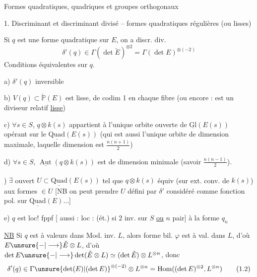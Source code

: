 Formes quadratiques, quadriques et groupes orthogonaux

1. Discriminant et discriminant divisé -- formes quadratiques régulières (ou lisses)

Si $q$ est une forme quadratique sur $E$, on a discr. div.
\[
\delta'(q)\in\Gamma(\det\check E)^{\otimes2}=\Gamma(\det E)^{\otimes(-2)}\tag*{(1.1)}
\]
Conditions équivalentes sur $q$.

a) $\delta'(q)$ inversible

b) $V(q)\subset\check{\mathbb P}(E)$ est lisse, de codim 1 en chaque fibre (ou encore : est un diviseur relatif \uline{lisse})

c) $\forall s\in S$, $q\otimes k(s)$\deleted{\unsure{$\in$}} appartient à l'unique orbite ouverte de $\underline{\mathrm{Gl}}(E(s))$ opérant sur le  $\underline{\mathrm{Quad}}(E(s))$ (qui est aussi l'unique orbite de dimension maximale, laquelle dimension est $\frac{n(n+1)}{2}$)

d) $\forall s\in S$, $\underline{\operatorname{Aut}}(q\otimes k(s))$ est de dimension minimale (savoir $\frac{n(n-1)}{2}$).

)  $\exists$ ouvert \deleted{$\unsure{\varnothing\ne}$} $U\subset\underline{\mathrm{Quad}}(E(s))$ tel que $q\otimes k(s)$ équiv\textsuperscript{} (sur ext. conv. de $k(s)$) aux formes $\in U$ [NB on peut prendre $U$ défini par $\delta'$ considéré comme fonction pol. sur $\underline{\mathrm{Quad}}(E)\ldots$]

e) $q$ est  loc! fppf [ aussi : loc : (ét.) si $2$ inv. sur $S$ \uline{ou} $n$ pair] à la forme  $q_n$

\uline{NB} Si $q$ est à valeurs dans Mod. inv. $L$, alors forme bil.  $\varphi$ est à val. dans $L$, d'où $E\unsure{-|\longrightarrow}\check E\otimes L$, d'où $\det E\unsure{-|\longrightarrow}\det(\check E\otimes L)\simeq(\det\check E)\otimes L^{\otimes n}$, donc
\[
\delta'(q)\in\Gamma{\unsure{\det(E)|(\det E)}}^{\otimes(-2)}\otimes L^{\otimes n}=\operatorname{Hom}((\det E)^{\otimes2},L^{\otimes n})\tag*{(1.2)}
\]
